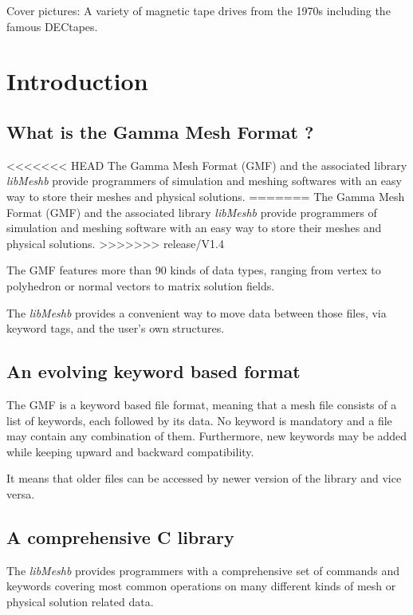\documentclass[a4paper,12pt]{article}
\begin{document}
\clearpage

\setcounter{tocdepth}{2}
\tableofcontents
\vfill

\footnotesize{Cover pictures: A variety of magnetic tape drives from the 1970s including the famous DECtapes.}
\normalsize

\clearpage


%
%

\section{Introduction}

\subsection{What is the Gamma Mesh Format ?}
<<<<<<< HEAD
The Gamma Mesh Format (GMF) and the associated library \emph{libMeshb} provide programmers of simulation and meshing softwares with an easy way to store their meshes and physical solutions.
=======
The Gamma Mesh Format (GMF) and the associated library \emph{libMeshb} provide programmers of simulation and meshing software with an easy way to store their meshes and physical solutions.
>>>>>>> release/V1.4

The GMF features more than 90 kinds of data types, ranging from vertex to polyhedron or normal vectors to matrix solution fields.

The \emph{libMeshb} provides a convenient way to move data between those files, via keyword tags, and the user's own structures.


\subsection{An evolving keyword based format}
The GMF is a keyword based file format, meaning that a mesh file consists of a list of keywords, each followed by its data. No keyword is mandatory and a file may contain any combination of them. Furthermore, new keywords may be added while keeping upward and backward compatibility.

It means that older files can be accessed by newer version of the library and vice versa.


\subsection{A comprehensive C library}
The \emph{libMeshb} provides programmers with a comprehensive set of commands and keywords covering most common operations on many different kinds of mesh or physical solution related data.
\end{document}
